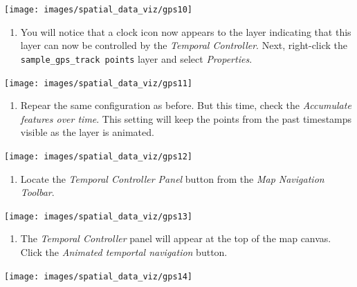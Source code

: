 \documentclass[
  12pt,
  a4paper]{article}
\providecommand{\tightlist}{%
  \setlength{\itemsep}{0pt}\setlength{\parskip}{0pt}}
\begin{document}
\begin{center}\texttt{[image: images/spatial\_data\_viz/gps10]} \end{center}

\begin{enumerate}
\def\labelenumi{\arabic{enumi}.}
\setcounter{enumi}{10}
\tightlist
\item
  You will notice that a clock icon now appears to the layer indicating
  that this layer can now be controlled by the \emph{Temporal
  Controller}. Next, right-click the \texttt{sample\_gps\_track\ points}
  layer and select \emph{Properties}.
\end{enumerate}

\begin{center}\texttt{[image: images/spatial\_data\_viz/gps11]} \end{center}

\begin{enumerate}
\def\labelenumi{\arabic{enumi}.}
\setcounter{enumi}{11}
\tightlist
\item
  Repear the same configuration as before. But this time, check the
  \emph{Accumulate features over time}. This setting will keep the
  points from the past timestamps visible as the layer is animated.
\end{enumerate}

\begin{center}\texttt{[image: images/spatial\_data\_viz/gps12]} \end{center}

\begin{enumerate}
\def\labelenumi{\arabic{enumi}.}
\setcounter{enumi}{12}
\tightlist
\item
  Locate the \emph{Temporal Controller Panel} button from the \emph{Map
  Navigation Toolbar}.
\end{enumerate}

\begin{center}\texttt{[image: images/spatial\_data\_viz/gps13]} \end{center}

\begin{enumerate}
\def\labelenumi{\arabic{enumi}.}
\setcounter{enumi}{13}
\tightlist
\item
  The \emph{Temporal Controller} panel will appear at the top of the map
  canvas. Click the \emph{Animated temportal navigation} button.
\end{enumerate}

\begin{center}\texttt{[image: images/spatial\_data\_viz/gps14]} \end{center}
\end{document}
